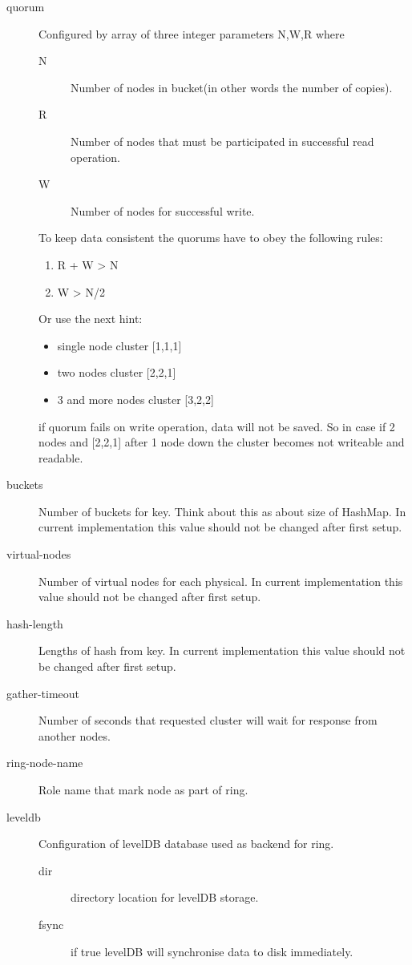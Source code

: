 \begin{description}
  \item[quorum] Configured by array of three integer parameters N,W,R where
  \begin{description}
    \item[N] Number of nodes in bucket(in other words the number of copies).
    \item[R] Number of nodes that must  be participated in successful read operation.
    \item[W] Number of nodes for successful write.
  \end{description}
  To keep data consistent the quorums have to obey the following rules:
  \begin{enumerate}
    \item R + W > N
    \item W > N/2
  \end{enumerate}
  Or use the next hint:
  \begin{itemize}
    \item single node cluster [1,1,1]
    \item two nodes cluster [2,2,1]
    \item 3 and more nodes cluster [3,2,2]
  \end{itemize}
  if quorum fails on write operation, data will not be saved. So in case if 2 nodes and [2,2,1] after 1 node down the cluster becomes not writeable and readable.
  \item[buckets] Number of buckets for key. Think about this as about size of HashMap. In current implementation this value should not be changed after first setup.
  \item[virtual-nodes] Number of virtual nodes for each physical. In current implementation this value should not be changed after first setup.
  \item[hash-length] Lengths of hash from key. In current implementation this value should not be changed after first setup.
  \item[gather-timeout] Number of seconds that requested cluster will wait for response from another nodes.
  \item[ring-node-name] Role name that mark node as part of ring.
  \item[leveldb] Configuration of levelDB database used as backend for ring.
  \begin{description}
    \item[dir] directory location for levelDB storage.
    \item[fsync] if true levelDB will synchronise data to disk immediately.
  \end{description}
\end{description}

